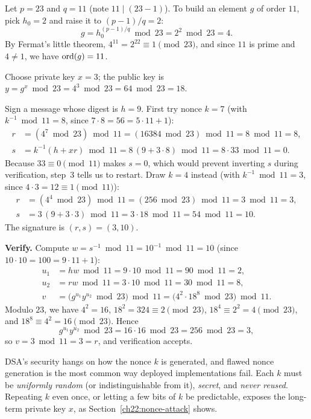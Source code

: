 \begin{example}
\label{ch22:ex-dsa}
Let $p = 23$ and $q = 11$ (note $11 \mid (23 - 1)$). To build an element $g$ of order $11$, pick $h_0 = 2$ and raise it to $(p-1)/q = 2$:
\[
  g = h_0^{(p-1)/q} \bmod 23 = 2^{2} \bmod 23 = 4.
\]
By Fermat's little theorem, $4^{11} = 2^{22} \equiv 1 \pmod{23}$, and since $11$ is prime and $4 \neq 1$, we have $\operatorname{ord}(g) = 11$.

Choose private key $x = 3$; the public key is $y = g^x \bmod 23 = 4^3 \bmod 23 = 64 \bmod 23 = 18$.

Sign a message whose digest is $h = 9$. First try nonce $k = 7$ (with $k^{-1} \bmod 11 = 8$, since $7\cdot 8 = 56 = 5\cdot 11 + 1$):
\begin{align*}
  r &= (4^{7} \bmod 23)\bmod 11 = (16384 \bmod 23)\bmod 11 = 8 \bmod 11 = 8, \\
  s &= k^{-1}(h + x r)\bmod 11 = 8\,(9 + 3\cdot 8)\bmod 11 = 8\cdot 33 \bmod 11 = 0.
\end{align*}
Because $33 \equiv 0 \pmod{11}$ makes $s = 0$, which would prevent inverting $s$ during verification, step~3 tells us to restart. Draw $k = 4$ instead (with $k^{-1} \bmod 11 = 3$, since $4\cdot 3 = 12 \equiv 1 \pmod{11}$):
\begin{align*}
  r &= (4^{4}\bmod 23)\bmod 11 = (256 \bmod 23)\bmod 11 = 3 \bmod 11 = 3, \\
  s &= 3\,(9 + 3\cdot 3)\bmod 11 = 3\cdot 18 \bmod 11 = 54 \bmod 11 = 10.
\end{align*}
The signature is $(r, s) = (3, 10)$.

\textbf{Verify.} Compute $w = s^{-1} \bmod 11 = 10^{-1}\bmod 11 = 10$ (since $10\cdot 10 = 100 = 9\cdot 11 + 1$):
\begin{align*}
  u_1 &= h w \bmod 11 = 9\cdot 10 \bmod 11 = 90 \bmod 11 = 2, \\
  u_2 &= r w \bmod 11 = 3\cdot 10 \bmod 11 = 30 \bmod 11 = 8, \\
  v   &= \bigl(g^{u_1} y^{u_2}\bmod 23\bigr)\bmod 11 = \bigl(4^{2}\cdot 18^{8} \bmod 23\bigr)\bmod 11.
\end{align*}
Modulo $23$, we have $4^2 = 16$, $18^2 = 324 \equiv 2 \pmod{23}$, $18^4 \equiv 2^2 = 4 \pmod{23}$, and $18^8 \equiv 4^2 = 16 \pmod{23}$. Hence
\[
  g^{u_1}y^{u_2} \bmod 23 = 16\cdot 16 \bmod 23 = 256 \bmod 23 = 3,
\]
so $v = 3 \bmod 11 = 3 = r$, and verification accepts.
\end{example}

\begin{trapbox}
DSA's security hangs on how the nonce $k$ is generated, and flawed nonce generation is the most common way deployed implementations fail. Each $k$ must be \emph{uniformly random} (or indistinguishable from it), \emph{secret}, and \emph{never reused}. Repeating $k$ even once, or letting a few bits of $k$ be predictable, exposes the long-term private key $x$, as Section~\ref{ch22:nonce-attack} shows.
\end{trapbox}

